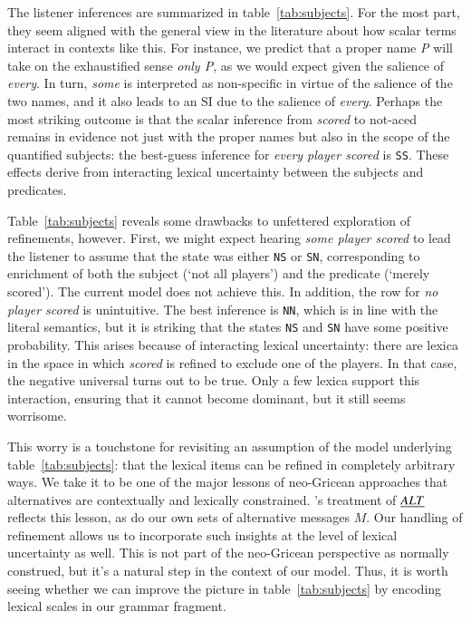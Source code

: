 \documentclass[leqno,12pt]{article}
\newcommand{\CFS}{\citetalias{ChierchiaFoxSpector08}}
\newcommand{\Tabref}[1]{Table~\ref{#1}}
\newcommand{\tabref}[1]{table~\ref{#1}}
\newcommand{\word}[1]{\emph{#1}}
\newcommand{\Messages}{M}
\newcommand{\ALT}{\emph{ALT}}
\newcommand{\world}[1]{\texttt{#1}}
\begin{document}
{The listener inferences are summarized in \tabref{tab:subjects}. For
the most part, they seem aligned with the general view in the
literature about how scalar terms interact in contexts like this. For
instance, we predict that a proper name \word{P} will take on the
exhaustified sense \word{only P}, as we would expect given the
salience of \word{every}. In turn, \word{some} is interpreted as
non-specific in virtue of the salience of the two names, and it also
leads to an SI due to the salience of \word{every}. Perhaps the most
striking outcome is that the scalar inference from \word{scored} to
not-aced remains in evidence not just with the proper names but also
in the scope of the quantified subjects: the best-guess inference for
\word{every player scored} is \world{SS}.  These effects derive from
interacting lexical uncertainty between the subjects and predicates.

\Tabref{tab:subjects} reveals some drawbacks to unfettered exploration
of refinements, however. First, we might expect hearing \word{some
  player scored} to lead the listener to assume that the state was
either \world{NS} or \world{SN}, corresponding to enrichment of both
the subject (`not all players') and the predicate (`merely
scored'). The current model does not achieve this. In addition, the
row for \word{no player scored} is unintuitive. The best inference is
\world{NN}, which is in line with the literal semantics, but it is
striking that the states \world{NS} and \world{SN} have some positive
probability. This arises because of interacting lexical uncertainty:
there are lexica in the space in which \word{scored} is refined to
exclude one of the players. In that case, the negative universal turns
out to be true. Only a few lexica support this interaction, ensuring
that it cannot become dominant, but it still seems worrisome.

This worry is a touchstone for revisiting an assumption of the model
underlying \tabref{tab:subjects}: that the lexical items can be
refined in completely arbitrary ways. We take it to be one of the
major lessons of neo-Gricean approaches that alternatives are
contextually and lexically constrained. \CFS's treatment of $\ALT$
reflects this lesson, as do our own sets of alternative messages
$\Messages$. Our handling of refinement allows us to incorporate such
insights at the level of lexical uncertainty as well. 
This is not part of the neo-Gricean perspective as normally construed,
but it's a natural step in the context of our model.
Thus, it is worth seeing whether we can improve the picture in
\tabref{tab:subjects} by encoding lexical scales in our grammar
fragment.

}
\end{document}
